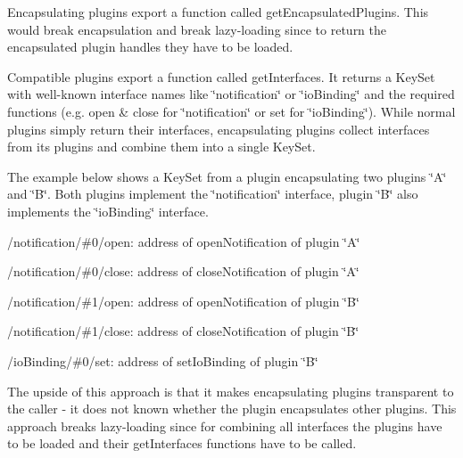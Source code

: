 \begin{DoxyItemize}
\item Encapsulating plugins export a function called {\ttfamily get\+Encapsulated\+Plugins}. This would break encapsulation and break lazy-\/loading since to return the encapsulated plugin handles they have to be loaded.
\item Compatible plugins export a function called {\ttfamily get\+Interfaces}. It returns a Key\+Set with well-\/known interface names like \char`\"{}notification\char`\"{} or \char`\"{}io\+Binding\char`\"{} and the required functions (e.\+g. {\ttfamily open} \& {\ttfamily close} for \char`\"{}notification\char`\"{} or {\ttfamily set} for \char`\"{}io\+Binding\char`\"{}). While normal plugins simply return their interfaces, encapsulating plugins collect interfaces from its plugins and combine them into a single Key\+Set.

The example below shows a Key\+Set from a plugin encapsulating two plugins \char`\"{}\+A\char`\"{} and \char`\"{}\+B\char`\"{}. Both plugins implement the \char`\"{}notification\char`\"{} interface, plugin \char`\"{}\+B\char`\"{} also implements the \char`\"{}io\+Binding\char`\"{} interface.
\begin{DoxyItemize}
\item {\ttfamily /notification/\#0/open}\+: address of {\ttfamily open\+Notification} of plugin \char`\"{}\+A\char`\"{}
\item {\ttfamily /notification/\#0/close}\+: address of {\ttfamily close\+Notification} of plugin \char`\"{}\+A\char`\"{}
\item {\ttfamily /notification/\#1/open}\+: address of {\ttfamily open\+Notification} of plugin \char`\"{}\+B\char`\"{}
\item {\ttfamily /notification/\#1/close}\+: address of {\ttfamily close\+Notification} of plugin \char`\"{}\+B\char`\"{}
\item {\ttfamily /io\+Binding/\#0/set}\+: address of {\ttfamily set\+Io\+Binding} of plugin \char`\"{}\+B\char`\"{}
\end{DoxyItemize}

The upside of this approach is that it makes encapsulating plugins transparent to the caller -\/ it does not known whether the plugin encapsulates other plugins. This approach breaks lazy-\/loading since for combining all interfaces the plugins have to be loaded and their {\ttfamily get\+Interfaces} functions have to be called.
\end{DoxyItemize}

